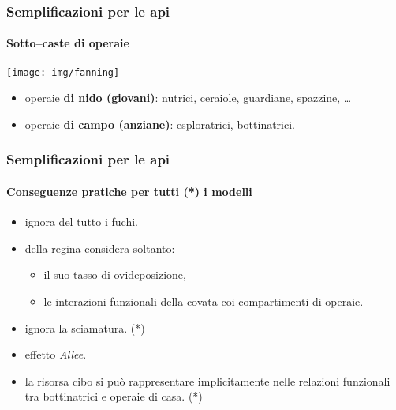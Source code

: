 \documentclass[]{beamer} %
\begin{document}
\begin{frame}
    \frametitle{Semplificazioni per le api}
    \framesubtitle{Sotto--caste di operaie}

    \begin{center}
        \texttt{[image: img/fanning]}
    \end{center}

    \begin{itemize}
        \item operaie \textbf{di nido (giovani)}: \pause nutrici, \pause ceraiole, guardiane, spazzine, \dots
        \item \pause operaie \textbf{di campo (anziane)}: \pause esploratrici, bottinatrici.
    \end{itemize}


\end{frame}

\begin{frame}
    \frametitle{Semplificazioni per le api}
    \framesubtitle{Conseguenze pratiche per tutti (*) i modelli}


    \begin{itemize}
        \item ignora del tutto i fuchi.
        \item \pause della regina considera soltanto:
        \begin{itemize}
            \item \pause il suo tasso di ovideposizione,
            \item \pause le interazioni funzionali della covata coi compartimenti di operaie.
        \end{itemize}
        \item \pause ignora la sciamatura. (*)
        \item \pause effetto \emph{Allee}.
        \item \pause la risorsa cibo si può rappresentare implicitamente nelle relazioni funzionali tra
            bottinatrici e operaie di casa. (*)
    \end{itemize}
\end{frame}
\end{document}
